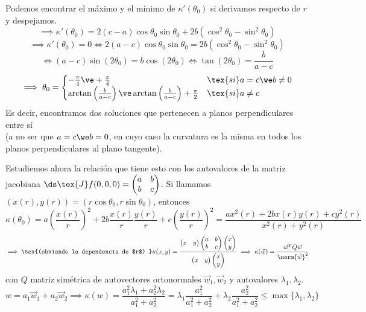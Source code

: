 Podemos encontrar el máximo y el mínimo de $\kappa'(\theta_0)$ si derivamos respecto de $r$ y despejamos.
\[\implies \kappa'(\theta_0) = 2(c - a)\cos\theta_0\sin\theta_0 + 2b(\cos^2\theta_0 - \sin^2\theta_0)\]
\[\implies \kappa'(\theta_0)=0 \iff 2(a-c)\cos\theta_0\sin\theta_0 = 2b(\cos^2\theta_0 - \sin^2\theta_0)\]
\[\iff (a-c)\sin(2\theta_0) = b\cos(2\theta_0) \iff \tan(2\theta_0) = \frac{b}{a-c}\]
\[\implies \theta_0 = \begin{cases}
		-\frac{\pi}{4} \ve +\frac{\pi}{4}                                                     & \tex{ si } a=c \we b\ne0 \\
		\arctan\left(\frac{b}{a-c}\right) \ve \arctan\left(\frac{b}{a-c}\right)+\frac{\pi}{2} & \tex{ si } a\neq c
	\end{cases}\]
Es decir, encontramos dos soluciones que pertenecen a planos perpendiculares entre sí \\(a no ser que $a=c \we b=0$, en cuyo caso la curvatura es la misma en todos los planos perpendiculares al plano tangente).

Estudiemos ahora la relación que tiene esto con los autovalores de la matriz jacobiana $\ds \tex{J}f (0,0,0) = \begin{pmatrix} a & b \\ b & c \end{pmatrix}$. Si llamamos $(x(r), y(r)) = (r\cos\theta_0, r\sin\theta_0)$, entonces
\[\kappa(\theta_0) = a\left(\frac{x(r)}{r}\right)^2 + 2b \frac{x(r)}{r} \frac{y(r)}{r} + c\left(\frac{y(r)}{r}\right)^2= \frac{ax^2(r) + 2bx(r)y(r) + cy^2(r)}{x^2(r) + y^2(r)}\]
\[\implies \tex{(obviando la dependencia de $r$) } \kappa(x, y) =  \frac{
		\begin{pmatrix} x & y\end{pmatrix} \begin{pmatrix} a & b \\ b & c \end{pmatrix} \begin{pmatrix} x \\ y \end{pmatrix}
	}{
		\begin{pmatrix} x & y \end{pmatrix} \begin{pmatrix} x \\ y \end{pmatrix}
	}
	\implies \kappa(\vec{w}) = \frac{\vec{w}^T Q \vec{w}}{\norm{\vec{w}}^2}\]
con $Q$ matriz simétrica de autovectores ortonormales $\vec{w}_1, \vec{w}_2$ y autovalores $\lambda_1, \lambda_2$.
\[w=a_1\vec{w}_1 + a_2\vec{w}_2 \implies \kappa(w) = \frac{a_1^2\lambda_1 + a_2^2\lambda_2}{a_1^2 + a_2^2} = \lambda_1\frac{a_1^2}{a_1^2 + a_2^2} + \lambda_2\frac{a_2^2}{a_1^2 + a_2^2}\leq \max\{\lambda_1, \lambda_2\}\]

